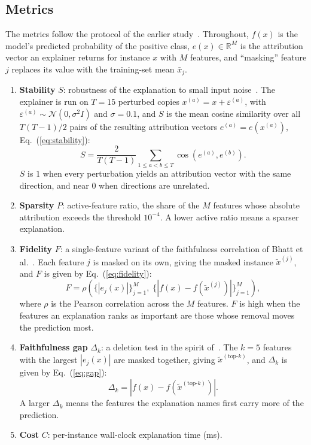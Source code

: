 \documentclass[11pt,a4paper]{article}
\begin{document}
\subsection{Metrics}
\label{sec:metrics}

The metrics follow the protocol of the earlier
study~\cite{herrera2026framework}. Throughout, $f(x)$ is the model's
predicted probability of the positive class, $e(x) \in \mathbb{R}^{M}$ is
the attribution vector an explainer returns for instance $x$ with $M$
features, and ``masking'' feature $j$ replaces its value with the
training-set mean $\bar{x}_j$.
\begin{enumerate}
\item \textbf{Stability} $S$: robustness of the explanation to small input
noise~\cite{alvarezmelis2018robustness}. The explainer is run on $T=15$
perturbed copies $x^{(a)} = x + \varepsilon^{(a)}$, with
$\varepsilon^{(a)} \sim \mathcal{N}(0, \sigma^2 I)$ and $\sigma=0.1$,
and $S$ is the mean cosine similarity over all $T(T-1)/2$ pairs of
the resulting attribution vectors $e^{(a)} = e(x^{(a)})$, Eq.~(\ref{eq:stability}):
\begin{equation}
S = \frac{2}{T(T-1)}\sum_{1 \le a<b \le T}\cos\!\left(e^{(a)},e^{(b)}\right).
\label{eq:stability}
\end{equation}
$S$ is $1$ when every perturbation yields an attribution vector with the
same direction, and near $0$ when directions are unrelated.
\item \textbf{Sparsity} $P$: active-feature ratio, the share of the $M$
features whose absolute attribution exceeds the threshold $10^{-4}$. A
lower active ratio means a sparser explanation.
\item \textbf{Fidelity} $F$: a single-feature variant of the faithfulness
correlation of Bhatt et al.~\cite{bhatt2020evaluating}. Each feature $j$ is
masked on its own, giving the masked instance $\tilde{x}^{(j)}$, and $F$
is given by Eq.~(\ref{eq:fidelity}):
\begin{equation}
F = \rho\!\left(\bigl\{|e_j(x)|\bigr\}_{j=1}^{M},\;
\bigl\{|f(x) - f(\tilde{x}^{(j)})|\bigr\}_{j=1}^{M}\right),
\label{eq:fidelity}
\end{equation}
where $\rho$ is the Pearson correlation across the $M$ features. $F$ is
high when the features an explanation ranks as important are those whose
removal moves the prediction most.
\item \textbf{Faithfulness gap} $\Delta_k$: a deletion test in the spirit
of~\cite{samek2017evaluating,hooker2019benchmark}. The $k=5$ features with
the largest $|e_j(x)|$ are masked together, giving
$\tilde{x}^{(\mathrm{top}\text{-}k)}$, and $\Delta_k$ is given by
Eq.~(\ref{eq:gap}):
\begin{equation}
\Delta_k = \left|f(x) - f\!\left(\tilde{x}^{(\mathrm{top}\text{-}k)}\right)\right|.
\label{eq:gap}
\end{equation}
A larger $\Delta_k$ means the features the explanation names first carry
more of the prediction.
\item \textbf{Cost} $C$: per-instance wall-clock explanation time (ms).
\end{enumerate}
\end{document}
